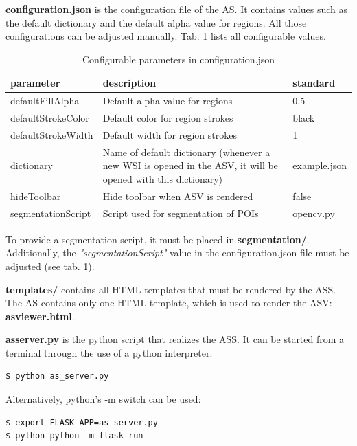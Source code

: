 \textbf{configuration.json} is the configuration file of the AS. It contains values such as the default dictionary and the default alpha value for regions. All those configurations can be adjusted manually. Tab. \ref{tab4_assConfig} lists all configurable values.

\begin{table}[H]
	\begin{center}
		\begin{tabular}{| p{3cm} | p{5.5cm} | p{2cm} |}
			\hline
			\textbf{parameter} & \textbf{description} & \textbf{standard}\\ \hline
			defaultFillAlpha & Default alpha value for regions & 0.5\\ \hline
			defaultStrokeColor & Default color for region strokes & black \\ \hline
			defaultStrokeWidth & Default width for region strokes & 1 \\ \hline
			dictionary & Name of default dictionary (whenever a new WSI is opened in the ASV, it will be opened with this dictionary) & example.json\\ \hline
			hideToolbar & Hide toolbar when ASV is rendered & false\\ \hline
			segmentationScript & Script used for segmentation of POIs & opencv.py\\ \hline
		\end{tabular}
		\caption{Configurable parameters in configuration.json}
		\label{tab4_assConfig}
	\end{center}
\end{table}

To provide a segmentation script, it must be placed in \textbf{segmentation/}. Additionally, the \emph{"segmentationScript"} value in the configuration.json file must be adjusted (see tab. \ref{tab4_assConfig}).

\textbf{templates/} contains all HTML templates that must be rendered by the ASS. The AS contains only one HTML template, which is used to render the ASV: \textbf{as{\textunderscore}viewer.html}.

\textbf{as{\textunderscore}server.py} is the python script that realizes the ASS. It can be started from a terminal through the use of a python interpreter:
\begin{lstlisting}
$ python as_server.py
\end{lstlisting}

Alternatively, python's -m switch can be used:
\begin{lstlisting}
$ export FLASK_APP=as_server.py
$ python python -m flask run
\end{lstlisting}

